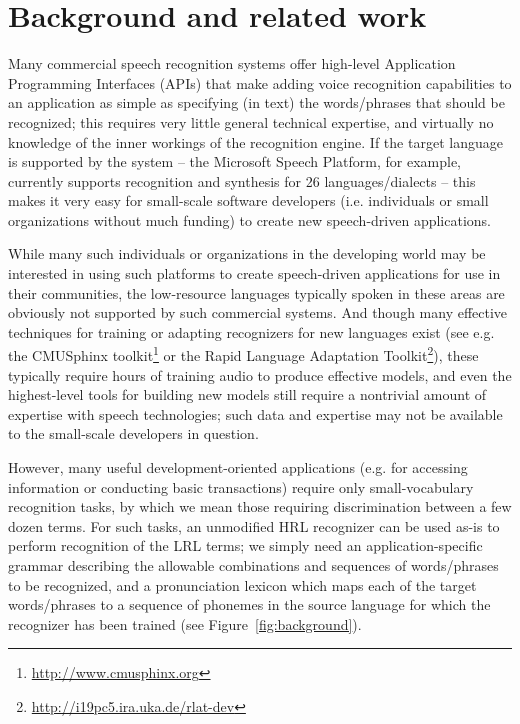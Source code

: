 \documentclass[11pt]{article}
\begin{document}
\section{Background and related work}
\label{sec:background}
Many commercial speech recognition systems offer high-level Application Programming Interfaces (APIs) that make adding voice recognition capabilities to an application as simple as specifying (in text) the words/phrases that should be recognized; this requires very little general technical expertise, and virtually no knowledge of the inner workings of the recognition engine. If the target language is supported by the system -- the Microsoft Speech Platform, for example, currently supports recognition and synthesis for 26 languages/dialects \cite{mspsdk} -- this makes it very easy for small-scale software developers (i.e. individuals or small organizations without much funding) to create new speech-driven applications. 

While many such individuals or organizations in the developing world may be interested in using such platforms to create speech-driven applications for use in their communities, the low-resource languages typically spoken in these areas are obviously not supported by such commercial systems. 
And though many effective techniques for training or adapting recognizers for new languages exist (see e.g. the CMUSphinx toolkit\footnote{\url{http://www.cmusphinx.org}} or the Rapid Language Adaptation Toolkit\footnote{\url{http://i19pc5.ira.uka.de/rlat-dev}}), these typically require hours of training audio to produce effective models, and even the highest-level tools for building new models still require a nontrivial amount of expertise with speech technologies; such data and expertise may not be available to the small-scale developers in question.

However, many useful development-oriented applications (e.g. for accessing information or conducting basic transactions) require only small-vocabulary recognition tasks, by which we mean those requiring discrimination between a few dozen terms.
For such tasks, an unmodified HRL recognizer can be used as-is to perform recognition of the LRL terms; we simply need an application-specific grammar describing the allowable combinations and sequences of words/phrases to be recognized, and a pronunciation lexicon which maps each of the target words/phrases to a sequence of phonemes in the source language for which the recognizer has been trained (see Figure~\ref{fig:background}).
\end{document}
